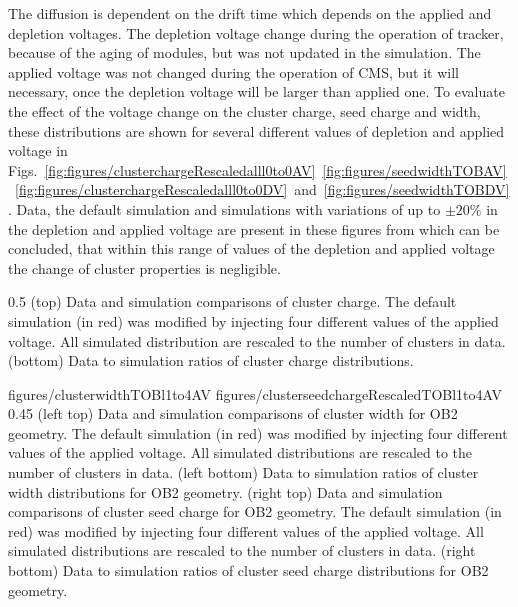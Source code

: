 The diffusion is dependent on the drift time which depends on the applied and depletion voltages. The depletion voltage change during the operation of tracker, because of the aging of modules, but was not updated in the simulation. The applied voltage was not changed during the operation of CMS, but it will necessary, once the depletion voltage will be larger than applied one. To evaluate the effect of the voltage change on the cluster charge, seed charge and width, these distributions are shown for several different values of depletion and applied voltage in Figs.~\ref{fig:figures/clusterchargeRescaledalll0to0AV}~\ref{fig:figures/seedwidthTOBAV}~\ref{fig:figures/clusterchargeRescaledalll0to0DV}~and~\ref{fig:figures/seedwidthTOBDV}. Data, the default simulation and simulations with variations of up to $\pm 20\%$ in the depletion and applied voltage are present in these figures from which can be concluded, that within this range of values of the depletion and applied voltage the change of cluster properties is negligible.

                 {0.5}       %
                 { (top) Data and simulation comparisons of cluster charge. The default simulation (in red) was modified by injecting four different values of the applied voltage. All simulated distribution are rescaled to the number of clusters in data. (bottom) Data to simulation ratios of cluster charge distributions. }

                 {figures/clusterwidthTOBl1to4AV}
                 {figures/clusterseedchargeRescaledTOBl1to4AV} %
                 {0.45}       %
                 {(left top) Data and simulation  comparisons of cluster width for OB2 geometry. The default simulation (in red) was modified by injecting four different values of the applied voltage. All simulated distributions are rescaled to the number of clusters in data. (left bottom) Data to simulation ratios of cluster width distributions for OB2 geometry. (right top) Data and simulation  comparisons of cluster seed charge for OB2 geometry. The default simulation (in red) was modified by injecting four different values of the applied voltage. All simulated distributions are rescaled to the number of clusters in data. (right bottom) Data to simulation ratios of cluster seed charge distributions for OB2 geometry. }


